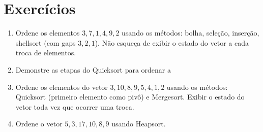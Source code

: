 \section{Exercícios}

\begin{enumerate}
\item Ordene os elementos $3, 7, 1, 4, 9, 2$ usando os métodos: bolha, seleção,
inserção, shellsort (com gaps $3, 2, 1$). Não esqueça de exibir o estado do vetor a cada troca
de elementos.

\item Demonstre as etapas do Quicksort para ordenar a 

\item Ordene os elementos do vetor $3, 10, 8, 9, 5, 4, 1, 2$ usando os métodos: 
Quicksort (primeiro elemento como pivô) e Mergesort. Exibir o estado do vetor toda vez que ocorrer 
uma troca.

\item Ordene o vetor $5, 3, 17, 10, 8, 9$ usando Heapsort.
\end{enumerate}
